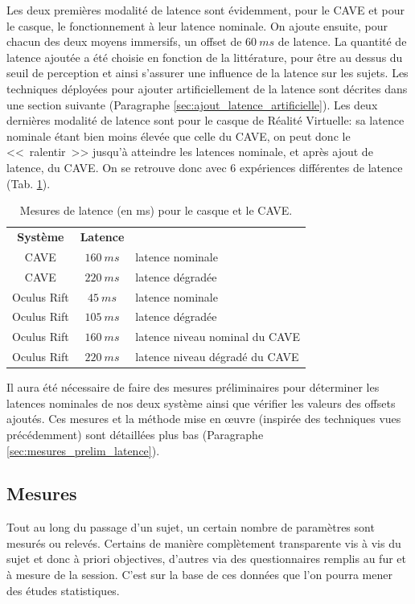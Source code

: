 	\par Les deux premières modalité de latence sont évidemment, pour le CAVE et pour le casque, le fonctionnement à leur latence nominale. On ajoute ensuite, pour chacun des deux moyens immersifs, un offset de $60~ms$ de latence. La quantité de latence ajoutée a été choisie en fonction de la littérature, pour être au dessus du seuil de perception et ainsi s'assurer une influence de la latence sur les sujets. Les techniques déployées pour ajouter artificiellement de la latence sont décrites dans une section suivante (Paragraphe \ref{sec:ajout_latence_artificielle}). Les deux dernières modalité de latence sont pour le casque de Réalité Virtuelle: sa latence nominale étant bien moins élevée que celle du CAVE, on peut donc le <<~ralentir~>> jusqu'à atteindre les latences nominale, et après ajout de latence, du CAVE. On se retrouve donc avec 6 expériences différentes de latence (Tab. \ref{tab:latence_casque_cave_expe}).
	
	\begin{table}[h]	
		\centering
		\caption{Mesures de latence (en ms) pour le casque et le CAVE.}
		\label{tab:latence_casque_cave_expe}
		\begin{tabular}{c|c|l}
			\textbf{Système} & \textbf{Latence}\\
			CAVE & $160~ms$ & latence nominale\\
			CAVE & $220~ms$ & latence dégradée\\
			Oculus Rift & $45~ms$ & latence nominale\\
			Oculus Rift & $105~ms$ & latence dégradée\\
			Oculus Rift & $160~ms$ & latence niveau nominal du CAVE\\
			Oculus Rift & $220~ms$ & latence niveau dégradé du CAVE\\
		\end{tabular}
	\end{table}
	
	\par Il aura été nécessaire de faire des mesures préliminaires pour déterminer les latences nominales de nos deux système ainsi que vérifier les valeurs des offsets ajoutés. Ces mesures et la méthode mise en œuvre (inspirée des techniques vues précédemment) sont détaillées plus bas (Paragraphe \ref{sec:mesures_prelim_latence}).
	
	\subsection{Mesures}
	\par Tout au long du passage d'un sujet, un certain nombre de paramètres sont mesurés ou relevés. Certains de manière complètement transparente vis à vis du sujet et donc à priori objectives, d'autres via des questionnaires remplis au fur et à mesure de la session. C'est sur la base de ces données que l'on pourra mener des études statistiques.
	
